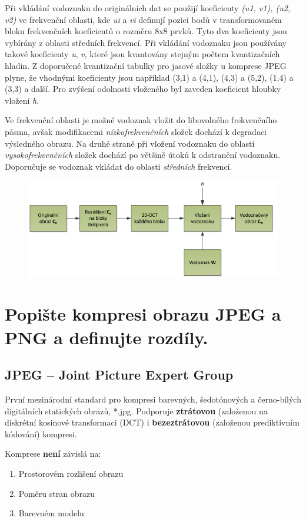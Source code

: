 Při vkládání vodoznaku do originálních dat se použijí koeficienty \textit{(u1, v1), (u2, v2)} ve frekvenční oblasti, kde \textit{ui} a \textit{vi} definují pozici bodů v transformovaném bloku frekvenčních koeficientů o rozměru 8x8 prvků. Tyto dva koeficienty jsou vybírány z oblasti středních frekvencí. Při vkládání vodoznaku jsou používány takové koeficienty \textit{u}, \textit{v}, které jsou kvantovány stejným počtem kvantizačních hladin. Z doporučené kvantizační tabulky pro jasové složky u komprese JPEG plyne, že vhodnými koeficienty jsou například (3,1) a (4,1), (4,3) a (5,2), (1,4) a (3,3) a další. Pro zvýšení odolnosti vloženého byl zaveden koeficient hloubky vložení \textit{h}.

Ve frekvenční oblasti je možné vodoznak vložit do libovolného frekvenčního pásma, avšak modifikacemi \textit{nízkofrekvenčních} složek dochází k degradaci výsledného obrazu. Na druhé straně při vložení vodoznaku do oblasti \textit{vysokofrekvenčních} složek dochází po většině útoků k odstranění vodoznaku. Doporučuje se vodoznak vkládat do oblasti \textit{středních} frekvencí.

\begin{figure}[ht]
    \centering
    \includegraphics[width=0.65\linewidth]{images/ffff.png}
\end{figure}
\FloatBarrier

\section{Popište kompresi obrazu JPEG a PNG a definujte rozdíly.}

\subsection{JPEG -- Joint Picture Expert Group}
První mezinárodní standard pro kompresi barevných, šedotónových a černo-bílých
digitálních statických obrazů, *.jpg. Podporuje \textbf{ztrátovou} (založenou na diskrétní kosinové transformaci (DCT) i \textbf{bezeztrátovou}
(založenou prediktivním kódování) kompresi.

Komprese \textbf{není} závislá na: \vspace{-4mm}
\begin{enumerate}
    \item Prostorovém rozlišení obrazu
    \item Poměru stran obrazu
    \item Barevném modelu
\end{enumerate}

